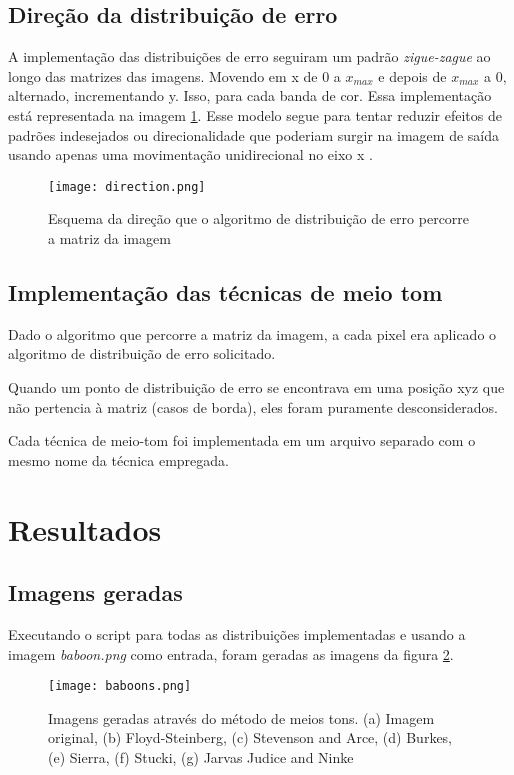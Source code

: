 \documentclass[conference]{IEEEtran}
\begin{document}
 \subsection{Direção da distribuição de erro}
 A implementação das distribuições de erro seguiram um padrão \textit{zigue-zague} ao longo das matrizes das imagens. Movendo em x de 0 a $x_{max}$ e depois de $x_{max}$ a 0, alternado, incrementando y. Isso, para cada banda de cor. Essa implementação está representada na imagem \ref{fig:dir}.
 Esse modelo segue para tentar reduzir efeitos de padrões indesejados ou direcionalidade que poderiam surgir na imagem de saída usando apenas uma movimentação unidirecional no eixo x \cite{helio}.

 \begin{figure}[ht]
     \centering
     \texttt{[image: direction.png]}
     \caption{Esquema da direção que o algoritmo de distribuição de erro percorre a matriz da imagem}
     \label{fig:dir}
 \end{figure}

  \subsection{Implementação das técnicas de meio tom}
 Dado o algoritmo que percorre a matriz da imagem, a cada pixel era aplicado o algoritmo de distribuição de erro solicitado.

 Quando um ponto de distribuição de erro se encontrava em uma posição xyz que não pertencia à matriz (casos de borda), eles foram puramente desconsiderados.

 Cada técnica de meio-tom foi implementada em um arquivo separado com o mesmo nome da técnica empregada.

 \section{Resultados}

 \subsection{Imagens geradas}

 Executando o script para todas as distribuições implementadas e usando a imagem \textit{baboon.png} como entrada, foram geradas as imagens da figura \ref{fig:results}.

 \begin{figure}[ht]
     \centering
     \texttt{[image: baboons.png]}
     \caption{Imagens geradas através do método de meios tons. (a) Imagem original, (b) Floyd-Steinberg, (c) Stevenson and Arce, (d) Burkes, (e) Sierra, (f) Stucki, (g) Jarvas Judice and Ninke}
     \label{fig:results}
 \end{figure}
\end{document}
